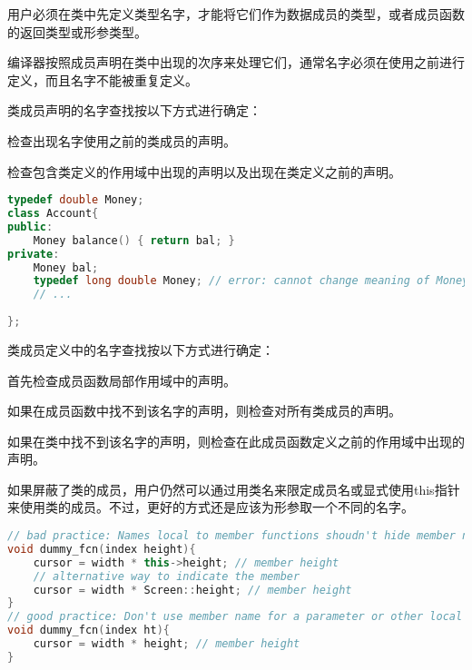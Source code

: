 \begin{compactitem}
\item 用户必须在类中先定义类型名字，才能将它们作为数据成员的类型，或者成员函数的返回类型或形参类型。
\item 编译器按照成员声明在类中出现的次序来处理它们，通常名字必须在使用之前进行定义，而且名字不能被重复定义。
\end{compactitem}



类成员声明的名字查找按以下方式进行确定：

\begin{compactitem}
\item 检查出现名字使用之前的类成员的声明。
\item 检查包含类定义的作用域中出现的声明以及出现在类定义之前的声明。
\end{compactitem}



\begin{lstlisting}[language=C++]
typedef double Money;
class Account{
public:
	Money balance() { return bal; }
private:
	Money bal;
	typedef long double Money; // error: cannot change meaning of Money
	// ...
	
};
\end{lstlisting}

类成员定义中的名字查找按以下方式进行确定：

\begin{compactitem}
\item 首先检查成员函数局部作用域中的声明。
\item 如果在成员函数中找不到该名字的声明，则检查对所有类成员的声明。
\item 如果在类中找不到该名字的声明，则检查在此成员函数定义之前的作用域中出现的声明。
\end{compactitem}

如果屏蔽了类的成员，用户仍然可以通过用类名来限定成员名或显式使用this指针来使用类的成员。不过，更好的方式还是应该为形参取一个不同的名字。


\begin{lstlisting}[language=C++]
// bad practice: Names local to member functions shoudn't hide member names
void dummy_fcn(index height){
	cursor = width * this->height; // member height
	// alternative way to indicate the member
	cursor = width * Screen::height; // member height
}
// good practice: Don't use member name for a parameter or other local variable
void dummy_fcn(index ht){
	cursor = width * height; // member height
}
\end{lstlisting}

